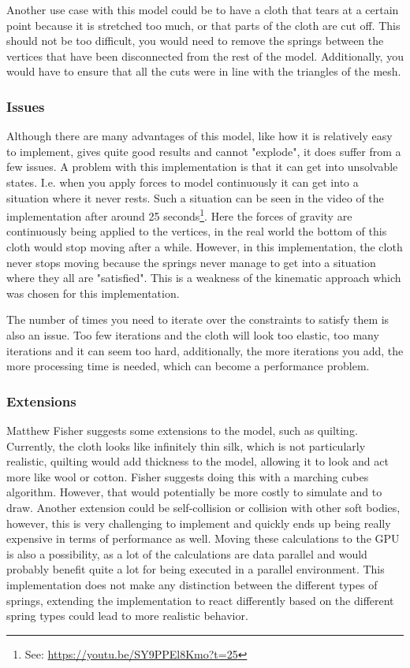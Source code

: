 Another use case with this model could be to have a cloth that tears at a certain point because it is stretched too much,
or that parts of the cloth are cut off. This should not be too difficult, you would need to remove the springs between
the vertices that have been disconnected from the rest of the model.
Additionally, you would have to ensure that all the cuts were in line with the triangles of the mesh.

\subsubsection{Issues}
Although there are many advantages of this model, like how it is relatively easy to implement, gives quite good results and cannot "explode", it does suffer from a few issues.
A problem with this implementation is that it can get into unsolvable states.
I.e. when you apply forces to model continuously it can get into a situation where it never rests.
Such a situation can be seen in the video of the implementation after around 25 seconds\footnote{See: \url{https://youtu.be/SY9PPEl8Kmo?t=25}}.
Here the forces of gravity are continuously being applied to the vertices, in the real world the bottom
of this cloth would stop moving after a while. However, in this implementation, the cloth never stops moving
because the springs never manage to get into a situation where they all are "satisfied".
This is a weakness of the kinematic approach which was chosen for this implementation\cite{math_for_games}.

The number of times you need to iterate over the constraints to satisfy them is also an issue.
Too few iterations and the cloth will look too elastic, too many iterations and it can seem too hard,
additionally, the more iterations you add, the more processing time is needed, which can become a performance problem.

\subsubsection{Extensions}
Matthew Fisher\cite{matthew_fisher} suggests some extensions to the model,
such as quilting. Currently, the cloth looks like infinitely thin silk, which is not particularly realistic,
quilting would add thickness to the model, allowing it to look and act more like wool or cotton. 
Fisher suggests doing this with a marching cubes algorithm.
However, that would potentially be more costly to simulate and to draw.
Another extension could be self-collision or collision with other soft bodies, however, this is very challenging to implement
and quickly ends up being really expensive in terms of performance as well.
Moving these calculations to the GPU is also a possibility, as a lot of the calculations are data parallel and would probably benefit quite a lot for being executed in a parallel environment.
This implementation does not make any distinction between the different types of springs, extending the implementation to react differently based on the different spring types could lead to more realistic behavior.
